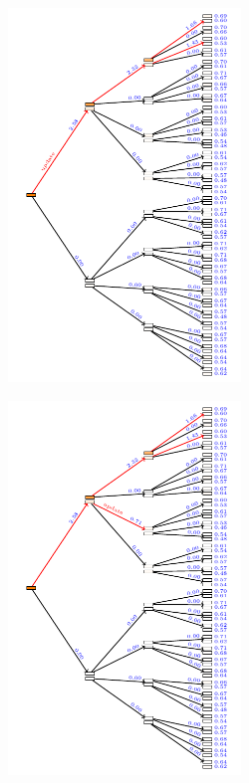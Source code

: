 \documentclass[aspectratio=169]{beamer}
\begin{document}
\begin{landscape}
    \begin{frame}
        \begin{figure}
            \includegraphics[width=0.55\textwidth]{trees/1/tex_tree_6.pdf}
        \end{figure}
    \end{frame}
\end{landscape}

\begin{landscape}
    \begin{frame}
        \begin{figure}
            \includegraphics[width=0.55\textwidth]{trees/1/tex_tree_7.pdf}
        \end{figure}
    \end{frame}
\end{landscape}
\end{document}
